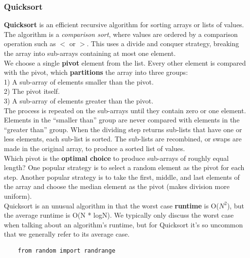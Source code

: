 \documentclass[11pt, a4paper]{article}
\begin{document}
\begin{spacing}{1.1}
	\subsubsection{Quicksort}
	\textbf{Quicksort} is an efficient recursive algorithm for sorting arrays or lists of values. The algorithm is a \textit{comparison sort}, where values are ordered by a comparison operation such as $<$ or $>$. This uses a divide and conquer strategy, breaking the array into sub-arrays containing at most one element. \vspace*{2mm} \\
	We choose a single \textbf{pivot} element from the list. Every other element is compared with the pivot, which \textbf{partitions} the array into three groups: \\
	\hspace*{3mm} 1) A sub-array of elements smaller than the pivot. \\
	\hspace*{3mm} 2) The pivot itself. \\
	\hspace*{3mm} 3) A sub-array of elements greater than the pivot. \vspace*{2mm} \\
	The process is repeated on the sub-arrays until they contain zero or one element. Elements in the “smaller than” group are never compared with elements in the “greater than” group. When the dividing step returns sub-lists that have one or less elements, each sub-list is sorted. The sub-lists are recombined, or swaps are made in the original array, to produce a sorted list of values. \vspace*{2mm} \\
	Which pivot is the \textbf{optimal choice} to produce sub-arrays of roughly equal length? One popular strategy is to select a random element as the pivot for each step. Another popular strategy is to take the first, middle, and last elements of the array and choose the median element as the pivot (makes division more uniform). \vspace*{2mm} \\
	Quicksort is an unusual algorithm in that the worst case \textbf{runtime} is O($N^2$), but the average runtime is O(N * logN). We typically only discuss the worst case when talking about an algorithm’s runtime, but for Quicksort it’s so uncommon that we generally refer to its average case. \newpage
	
	\begin{lstlisting}
	from random import randrange
	

\end{lstlisting}
\end{spacing}
\end{document}

